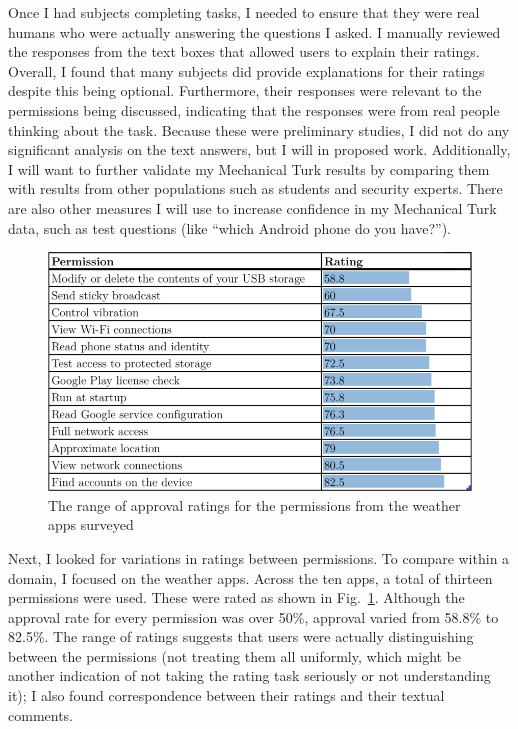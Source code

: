\documentclass[11pt]{article}
\begin{document}
Once I had subjects completing tasks, I needed to ensure that they 
were real humans who were actually answering the questions I
asked. I manually reviewed the responses from the text boxes
that allowed users to explain their ratings. Overall, I found that
many subjects did provide explanations for their ratings despite this being
optional. Furthermore, their responses were relevant to the
permissions being discussed, indicating that the responses were from
real people thinking about the task. Because these were preliminary
studies, I did not do any significant analysis on the text answers,
but I will in proposed work. Additionally, I will want to further
validate my Mechanical Turk results by comparing them with results
from other populations such as students and security experts. 
There are also other measures I will
use to increase confidence in my Mechanical Turk data, such as test
questions (like ``which Android phone do you have?'').

\begin{figure}[t]
\centering
    \includegraphics[width=.6\linewidth]{img/RatingTable.png}
    \vspace{1pt}
    \caption{The range of approval ratings for the permissions from the 
    weather apps surveyed}
    \label{weatherratings}
\end{figure}

Next, I looked for variations in ratings between permissions. To
compare within a domain, I focused on the weather apps. Across the
ten apps, a total of thirteen permissions were used. These were rated
as shown in Fig.~\ref{weatherratings}.  Although the approval rate for
every permission was over 50\%, approval varied from 58.8\% to
82.5\%. The range of ratings suggests that users were actually
distinguishing between the permissions (not treating them all
uniformly, which might be another indication of not taking the rating
task seriously or not understanding it); I also found correspondence
between their ratings and their textual comments.
\end{document}

